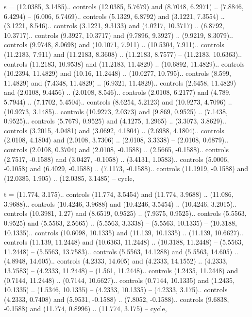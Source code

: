 s = {(12.0385, 3.1485).. controls (12.0385, 5.7679) and (8.7048, 6.2971) .. (7.8846, 6.4294) -- (6.006, 6.7469).. controls (5.1329, 6.8792) and (3.1221, 7.3554) .. (3.1221, 8.546).. controls (3.1221, 9.3133) and (4.0217, 10.3717) .. (6.8792, 10.3717).. controls (9.3927, 10.3717) and (9.7896, 9.3927) .. (9.9219, 8.3079).. controls (9.9748, 8.0698) and (10.1071, 7.911) .. (10.5304, 7.911).. controls (11.2183, 7.911) and (11.2183, 8.3608) .. (11.2183, 8.7577) -- (11.2183, 10.6363).. controls (11.2183, 10.9538) and (11.2183, 11.4829) .. (10.6892, 11.4829).. controls (10.2394, 11.4829) and (10.16, 11.2448) .. (10.0277, 10.795).. controls (8.599, 11.4829) and (7.4348, 11.4829) .. (6.9321, 11.4829).. controls (2.6458, 11.4829) and (2.0108, 9.4456) .. (2.0108, 8.546).. controls (2.0108, 6.2177) and (4.789, 5.7944) .. (7.1702, 5.4504).. controls (8.6254, 5.2123) and (10.9273, 4.7096) .. (10.9273, 3.1485).. controls (10.9273, 2.0373) and (9.869, 0.9525) .. (7.1438, 0.9525).. controls (5.7679, 0.9525) and (4.1275, 1.2965) .. (3.3073, 3.8629).. controls (3.2015, 4.0481) and (3.0692, 4.1804) .. (2.6988, 4.1804).. controls (2.0108, 4.1804) and (2.0108, 3.7306) .. (2.0108, 3.3338) -- (2.0108, 0.6879).. controls (2.0108, 0.3704) and (2.0108, -0.1588) .. (2.5665, -0.1588).. controls (2.7517, -0.1588) and (3.0427, -0.1058) .. (3.4131, 1.0583).. controls (5.0006, -0.1058) and (6.4029, -0.1588) .. (7.1173, -0.1588).. controls (11.1919, -0.1588) and (12.0385, 1.905) .. (12.0385, 3.1485) -- cycle},

t = {(11.774, 3.175).. controls (11.774, 3.5454) and (11.774, 3.9688) .. (11.086, 3.9688).. controls (10.4246, 3.9688) and (10.4246, 3.5454) .. (10.4246, 3.2015).. controls (10.3981, 1.27) and (8.6519, 0.9525) .. (7.9375, 0.9525).. controls (5.5563, 0.9525) and (5.5563, 2.5665) .. (5.5563, 3.3338) -- (5.5563, 10.1335) -- (10.3188, 10.1335).. controls (10.6098, 10.1335) and (11.139, 10.1335) .. (11.139, 10.6627).. controls (11.139, 11.2448) and (10.6363, 11.2448) .. (10.3188, 11.2448) -- (5.5563, 11.2448) -- (5.5563, 13.7583).. controls (5.5563, 14.1288) and (5.5563, 14.605) .. (4.8948, 14.605).. controls (4.2333, 14.605) and (4.2333, 14.1552) .. (4.2333, 13.7583) -- (4.2333, 11.2448) -- (1.561, 11.2448).. controls (1.2435, 11.2448) and (0.7144, 11.2448) .. (0.7144, 10.6627).. controls (0.7144, 10.1335) and (1.2435, 10.1335) .. (1.5346, 10.1335) -- (4.2333, 10.1335) -- (4.2333, 3.175).. controls (4.2333, 0.7408) and (5.9531, -0.1588) .. (7.8052, -0.1588).. controls (9.6838, -0.1588) and (11.774, 0.8996) .. (11.774, 3.175) -- cycle},

